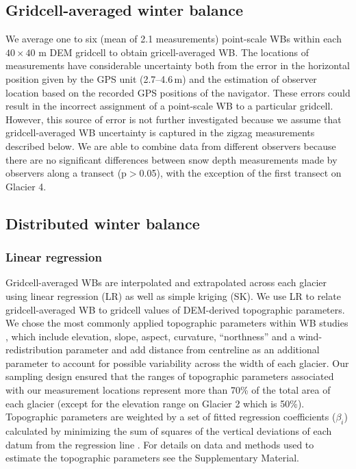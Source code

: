 \documentclass[twocolumn, letterpaper]{igs}
\begin{document}
\subsection{Gridcell-averaged winter balance}

We average one to six (mean of 2.1 measurements) point-scale WBs within each $40 \times 40$ m DEM gridcell to obtain gricell-averaged WB. The locations of measurements have considerable uncertainty both from the error in the horizontal position given by the GPS unit (2.7--4.6\,m) and the estimation of observer location based on the recorded GPS positions of the navigator. These errors could result in the incorrect assignment of a point-scale WB to a particular gridcell. However, this source of error is not further investigated because we assume that gridcell-averaged WB uncertainty is captured in the zigzag measurements described below. We are able to combine data from different observers because there are no significant differences between snow depth measurements made by observers along a transect (p$>$0.05), with the exception of the first transect on Glacier 4. 

\subsection{Distributed winter balance}

\subsubsection{Linear regression}

Gridcell-averaged WBs are interpolated and extrapolated across each glacier using linear regression (LR) as well as simple kriging (SK). We use LR to relate gridcell-averaged WB to gridcell values of DEM-derived topographic parameters. We chose the most commonly applied topographic parameters within WB studies \citep[e.g.][]{McGrath2015}, which include elevation, slope, aspect, curvature, ``northness'' and a wind-redistribution parameter and add distance from centreline as an additional parameter to account for possible variability across the width of each glacier. Our sampling design ensured that the ranges of topographic parameters associated with our measurement locations represent more than 70\% of the total area of each glacier (except for the elevation range on Glacier 2 which is 50\%). Topographic parameters are weighted by a set of fitted regression coefficients ($\beta_i$) calculated by minimizing the sum of squares of the vertical deviations of each datum from the regression line \citep{Davis1986}. For details on data and methods used to estimate the topographic parameters see the Supplementary Material. 
\end{document}
